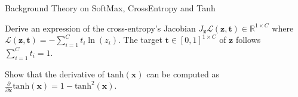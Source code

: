 \documentclass[
	ngerman,
	points=true,%
    solution=true,
    accentcolor=9c,
    colorbacktitle
	]{tudaexercise}
\begin{document}
\begin{task}{Background Theory on SoftMax, CrossEntropy and Tanh}
\begin{subtask}
Derive an expression of the cross-entropy's Jacobian $J_{\mathbf{z}}\mathcal{L}(\mathbf{z}, \mathbf{t})\in\mathbb{R}^{1\times C}$ where $\mathcal{L}(\mathbf{z}, \mathbf{t})=-\sum_{i=1}^{C}t_i\ln(z_i)$. The target $\mathbf{t}\in \left[0, 1\right]^{1\times C}$ of $\mathbf{z}$ follows $\sum_{i=1}^{C}t_i=1$.  
\end{subtask}
\begin{solution}
\end{solution}

\begin{subtask}
Show that the derivative of $\text{tanh}(\mathbf{x})$ can be computed as $\frac{\partial}{\partial \mathbf{x}}\text{tanh}(\mathbf{x})=1-\text{tanh}^{2}(\mathbf{x})$. 
\end{subtask}
\begin{solution}
\end{solution}

\end{task}
\end{document}
